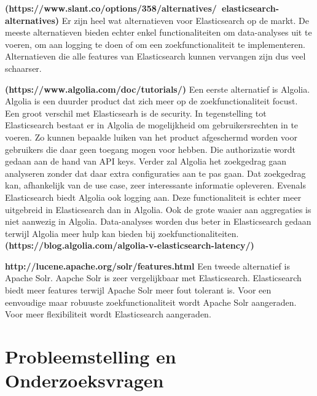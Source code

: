 \textbf{(https://www.slant.co/options/358/alternatives/~elasticsearch-alternatives)}
Er zijn heel wat alternatieven voor Elasticsearch op de markt. De meeste alternatieven bieden echter enkel functionaliteiten om data-analyses uit te voeren, om aan logging te doen of om een zoekfunctionaliteit te implementeren. Alternatieven die alle features van Elasticsearch kunnen vervangen zijn dus veel schaarser. 

\textbf{(https://www.algolia.com/doc/tutorials/)}
Een eerste alternatief is Algolia. Algolia is een duurder product dat zich meer op de zoekfunctionaliteit focust. Een groot verschil met Elasticsearh is de security. In tegenstelling tot Elasticsearch bestaat er in Algolia de mogelijkheid om gebruikersrechten in te voeren. Zo kunnen bepaalde luiken van het product afgeschermd worden voor gebruikers die daar geen toegang mogen voor hebben. Die authorizatie wordt gedaan aan de hand van API keys. Verder zal Algolia het zoekgedrag gaan analyseren zonder dat daar extra configuraties aan te pas gaan. Dat zoekgedrag kan, afhankelijk van de use case, zeer interessante informatie opleveren. Evenals Elasticsearch biedt Algolia ook logging aan. Deze functionaliteit is echter meer uitgebreid in Elasticsearch dan in Algolia. Ook de grote waaier aan aggregaties is niet aanwezig in Algolia. Data-analyses worden dus beter in Elasticsearch gedaan terwijl Algolia meer hulp kan bieden bij zoekfunctionaliteiten. \textbf{(https://blog.algolia.com/algolia-v-elasticsearch-latency/)}

\textbf{http://lucene.apache.org/solr/features.html}
Een tweede alternatief is Apache Solr. Aapche Solr is zeer vergelijkbaar met Elasticsearch. Elasticsearch biedt meer features terwijl Apache Solr meer fout tolerant is. Voor een eenvoudige maar robuuste zoekfunctionaliteit wordt Apache Solr aangeraden. Voor meer flexibiliteit wordt Elasticsearch aangeraden.

\section{Probleemstelling en Onderzoeksvragen}
\label{sec:onderzoeksvragen}


